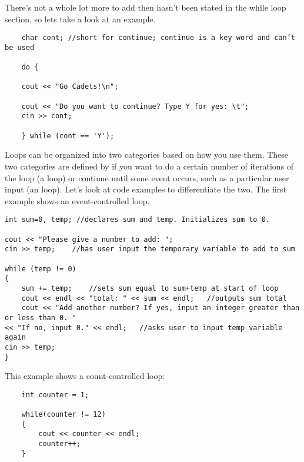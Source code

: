 There’s not a whole lot more to add then hasn’t been stated in the while loop section, so lets take a look at an example.

\begin{lstlisting}
    char cont; //short for continue; continue is a key word and can’t be used

    do {

    cout << "Go Cadets!\n";

    cout << "Do you want to continue? Type Y for yes: \t";
    cin >> cont;

    } while (cont == 'Y');
\end{lstlisting}


Loops can be organized into two categories based on how you use them.
These two categories are defined by if you want to do a certain number of iterations of the loop (a  loop) or continue until some event occurs, such as a particular user input (an  loop).
Let’s look at code examples to differentiate the two. The first example shows an event-controlled  loop.

\noindent\begin{minipage}{\textwidth}\begin{lstlisting}
int sum=0, temp; //declares sum and temp. Initializes sum to 0.

cout << "Please give a number to add: ";
cin >> temp;	//has user input the temporary variable to add to sum

while (temp != 0) 
{
	sum += temp;	//sets sum equal to sum+temp at start of loop
	cout << endl << "total: " << sum << endl;	//outputs sum total
	cout << "Add another number? If yes, input an integer greater than or less than 0. "
<< "If no, input 0." << endl;	//asks user to input temp variable again
cin >> temp;
}
\end{lstlisting}\end{minipage}

\noindent This example shows a count-controlled  loop:

\begin{lstlisting}
    int counter = 1;

    while(counter != 12)
    {
        cout << counter << endl;
        counter++;
    }
\end{lstlisting}


